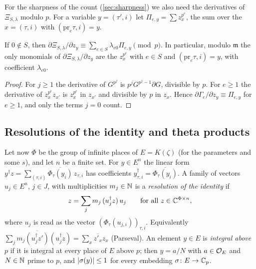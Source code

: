For the sharpness of the count (\cref{sec:sharpness}) we also need the derivatives of
$\Xi_{S,\lambda}$ modulo $p$. For a variable $y=(\tau',i)$ let $\Pi_{e,y}=\sum z_x^{p^e}$, the sum over
the $x=(\tau,i)$ with $(\mathrm{pr}_e\tau,i)=y$.

\begin{lemma}\label{lem:derivative-coupling-sum}
If $0\notin S$, then $\partial\Xi_{S,\lambda}/\partial z_y\equiv\sum_{e\in S}\lambda_{e0}\Pi_{e,y}
\pmod p$. In particular, modulo $\mathfrak m$ the only monomials of $\partial\Xi_{S,\lambda}/\partial
z_y$ are the $z_x^{p^e}$ with $e\in S$ and $(\mathrm{pr}_e\tau,i)=y$, with coefficient
$\lambda_{e0}$.
\end{lemma}

\begin{proof}
For $j\ge1$ the derivative of $G^{p^j}$ is $p^jG^{p^j-1}\partial G$, divisible by $p$. For $e\ge1$
the derivative of $z_x^{p^e}z_{x'}$ is $z_x^{p^e}$ in $z_{x'}$ and divisible by $p$ in $z_x$. Hence
$\partial\Gamma_e/\partial z_y\equiv\Pi_{e,y}$ for $e\ge1$, and only the terms $j=0$ count.
\end{proof}

\subsection{Resolutions of the identity and theta products}\label{ss:resolutions}
Let now $\Phi$ be the group of infinite places of $E=K(\zeta)$ (for the parameters and some $s$), and
let $n$ be a finite set. For $y\in E^n$ the linear form $y^\dagger z=\sum_{(\tau,i)}
\overline{\Phi_\tau(y_i)}\,z_{\tau,i}$ has coefficients $y^\dagger_{\tau,i}=\overline{\Phi_\tau(y_i)}$.
A family of vectors $u_j\in E^n$, $j\in J$, with multiplicities $m_j\in\mathbb{N}$ is a \emph{resolution of
the identity} if
\[
  z=\sum_jm_j\,(u_j^\dagger z)\,u_j\qquad\text{for all }z\in\mathbb{C}^{\Phi\times n},
\]
where $u_j$ is read as the vector $(\Phi_\tau(u_{j,i}))_{\tau,i}$. Equivalently
$\sum_jm_j\overline{(u_j^\dagger z')}(u_j^\dagger z)=\sum_x\overline{z'_x}z_x$ (Parseval). An element
$y\in E$ is \emph{integral above $p$} if it is integral at every place of $E$ above $p$; then
$y=a/N$ with $a\in\mathcal{O}_E$ and $N\in\mathbb{N}$ prime to $p$, and $\lvert \sigma(y)\rvert\le1$ for every embedding
$\sigma\colon E\to\mathbb{C}_p$.


